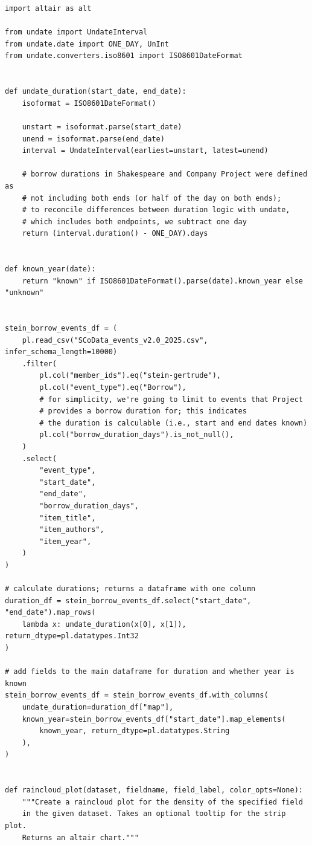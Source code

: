\documentclass[final]{anthology-ch} %
\begin{document}
\begin{verbatim}
import altair as alt

from undate import UndateInterval
from undate.date import ONE_DAY, UnInt
from undate.converters.iso8601 import ISO8601DateFormat


def undate_duration(start_date, end_date):
    isoformat = ISO8601DateFormat()

    unstart = isoformat.parse(start_date)
    unend = isoformat.parse(end_date)
    interval = UndateInterval(earliest=unstart, latest=unend)

    # borrow durations in Shakespeare and Company Project were defined as
    # not including both ends (or half of the day on both ends);
    # to reconcile differences between duration logic with undate, 
    # which includes both endpoints, we subtract one day
    return (interval.duration() - ONE_DAY).days


def known_year(date):
    return "known" if ISO8601DateFormat().parse(date).known_year else "unknown"


stein_borrow_events_df = (
    pl.read_csv("SCoData_events_v2.0_2025.csv", infer_schema_length=10000)
    .filter(
        pl.col("member_ids").eq("stein-gertrude"),
        pl.col("event_type").eq("Borrow"),
        # for simplicity, we're going to limit to events that Project
        # provides a borrow duration for; this indicates
        # the duration is calculable (i.e., start and end dates known)
        pl.col("borrow_duration_days").is_not_null(),
    )
    .select(
        "event_type",
        "start_date",
        "end_date",
        "borrow_duration_days",
        "item_title",
        "item_authors",
        "item_year",
    )
)

# calculate durations; returns a dataframe with one column
duration_df = stein_borrow_events_df.select("start_date", "end_date").map_rows(
    lambda x: undate_duration(x[0], x[1]), return_dtype=pl.datatypes.Int32
)

# add fields to the main dataframe for duration and whether year is known
stein_borrow_events_df = stein_borrow_events_df.with_columns(
    undate_duration=duration_df["map"],
    known_year=stein_borrow_events_df["start_date"].map_elements(
        known_year, return_dtype=pl.datatypes.String
    ),
)


def raincloud_plot(dataset, fieldname, field_label, color_opts=None):
    """Create a raincloud plot for the density of the specified field
    in the given dataset. Takes an optional tooltip for the strip plot.
    Returns an altair chart."""


\end{verbatim}
\end{document}
